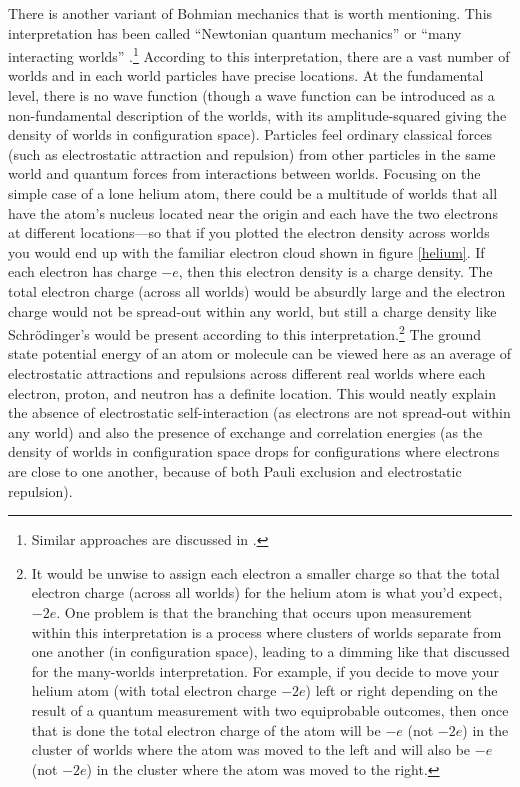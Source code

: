 \documentclass[12pt,onecolumn,secnumarabic,amsmath,amssymb,balancelastpage,nofootinbib]{article}
\begin{document}
There is another variant of Bohmian mechanics that is worth mentioning.  This interpretation has been called ``Newtonian quantum mechanics'' \cite{sebens2015} or ``many interacting worlds'' \cite{HDW}.\footnote{Similar approaches are discussed in \cite{holland2005, tipler2006, schiff2012, bostrom2015, bokulich2020}.}  According to this interpretation, there are a vast number of worlds and in each world particles have precise locations.  At the fundamental level, there is no wave function (though a wave function can be introduced as a non-fundamental description of the worlds, with its amplitude-squared giving the density of worlds in configuration space).  Particles feel ordinary classical forces (such as electrostatic attraction and repulsion) from other particles in the same world and quantum forces from interactions between worlds.  Focusing on the simple case of a lone helium atom, there could be a multitude of worlds that all have the atom's nucleus located near the origin and each have the two electrons at different locations---so that if you plotted the electron density across worlds you would end up with the familiar electron cloud shown in figure \ref{helium}.  If each electron has charge $-e$, then this electron density is a charge density.  The total electron charge (across all worlds) would be absurdly large and the electron charge would not be spread-out within any world, but still a charge density like Schr\"{o}dinger's would be present according to this interpretation.\footnote{It would be unwise to assign each electron a smaller charge so that the total electron charge (across all worlds) for the helium atom is what you'd expect, $-2e$.  One problem is that the branching that occurs upon measurement within this interpretation is a process where clusters of worlds separate from one another (in configuration space), leading to a dimming like that discussed for the many-worlds interpretation.  For example, if you decide to move your helium atom (with total electron charge $-2e$) left or right depending on the result of a quantum measurement with two equiprobable outcomes, then once that is done the total electron charge of the atom will be $-e$ (not $-2e$) in the cluster of worlds where the atom was moved to the left and will also be $-e$ (not $-2e$) in the cluster where the atom was moved to the right.}  The ground state potential energy of an atom or molecule can be viewed here as an average of electrostatic attractions and repulsions across different real worlds where each electron, proton, and neutron has a definite location.  This would neatly explain the absence of electrostatic self-interaction (as electrons are not spread-out within any world) and also the presence of exchange and correlation energies (as the density of worlds in configuration space drops for configurations where electrons are close to one another, because of both Pauli exclusion and electrostatic repulsion).
\end{document}
